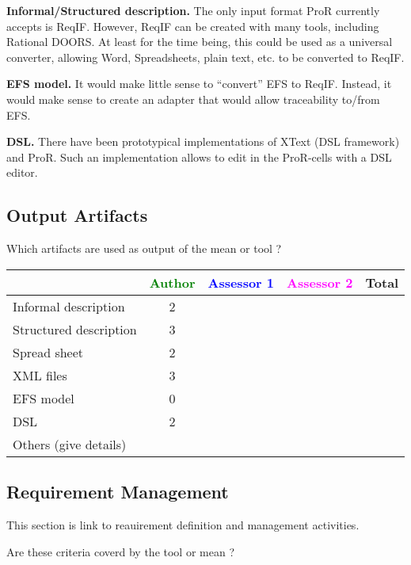 \begin{author_comment}

\textbf{Informal/Structured description.} The only input format ProR currently accepts is ReqIF.  However, ReqIF can be created with many tools, including Rational DOORS.  At least for the time being, this could be used as a universal converter, allowing Word, Spreadsheets, plain text, etc. to be converted to ReqIF.

\textbf{EFS model.} It would make little sense to ``convert'' EFS to ReqIF.  Instead, it would make sense to create an adapter that would allow traceability to/from EFS.

\textbf{DSL.} There have been prototypical implementations of XText (DSL framework) and ProR.  Such an implementation allows to edit in the ProR-cells with a DSL editor.
\end{author_comment}



\subsection{Output Artifacts}

Which artifacts are used as output of the mean or tool  ? 


\begin{tabular}{|l | c | c | c | c|}
\hline
& \textcolor{green}{Author} & \textcolor{blue}{Assessor 1} & \textcolor{magenta}{Assessor 2} & Total \\
\hline 
Informal description & 2 & & &  \\
\hline
Structured description & 3 & & & \\
\hline
Spread sheet & 2 & & & \\
\hline
XML files & 3 & & & \\
\hline
EFS model & 0 & & & \\
\hline
DSL & 2 & & & \\
\hline
Others (give details) & & & & \\
\hline
\end{tabular}


\subsection{Requirement Management}

This section is link to reauirement definition and management activities.

Are these criteria coverd by the tool or mean ? 


